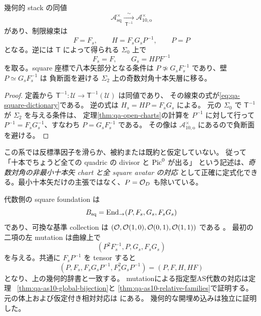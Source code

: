 \begin{corollary}
\label{cor:qa-square-chart}
幾何的 stack の同値
\[
 \mathcal A_{\mathrm{sq}}^{\times}
 \xrightarrow[\ \mathsf T^{-1}\ ]{\ \sim\ }
 \mathcal A_{10,\mathrm o}^{\times}
\]
があり、制限線束は
\begin{equation}
 F=F_s,\qquad H=F_sG_sP^{-1},\qquad P=P
 \label{eq:qa-square-dictionary}
\end{equation}
となる。逆には $\mathsf T$ によって得られる $\Sigma _0$ 上で
\[
 F_s=F,\qquad G_s=HPF^{-1}
\]
を取る。square 座標で八本矢部分となる条件は
$P\not\simeq G_sF_s^{-1}$ であり、壁 $P\simeq G_sF_s^{-1}$ は
負断面を避ける $\Sigma _2$ 上の奇数対角十本矢層に移る。
\end{corollary}

\begin{proof}
定義から $\mathsf T^{-1}:\mathcal U\to\mathsf T^{-1}(\mathcal U)$ は同値であり、
その線束の式が\eqref{eq:qa-square-dictionary}である。
逆の式は $H_s=HP=F_sG_s$ による。
元の $\Sigma _0$ で $\mathsf T^{-1}$ が $\Sigma _2$ を与える条件は、
定理\ref{thm:qa-open-charts}の計算を $P^{-1}$ に対して行って
$P^{-1}=F_sG_s^{-1}$、すなわち $P=G_sF_s^{-1}$ である。
その像は $\mathcal A_{10,\mathrm o}^{\times}$ にあるので負断面を避ける。
\end{proof}

この系では反標準因子を滑らか、被約または既約と仮定していない。
従って「十本でちょうど全ての quadric の divisor と $\operatorname{Pic}^0$ が出る」
という記述は、\emph{奇数対角の非最小十本矢 chart と全 square avatar の対応}
として正確に定式化できる。最小十本矢だけの主張ではなく、$P=\mathcal O_D$ も除いている。

代数側の square foundation は
\[
 B_{\mathrm{sq}}=\operatorname{End}_{\to}(P,F_s,G_s,F_sG_s)
\]
であり、可換な基準 collection は
$(\mathcal O,\mathcal O(1,0),\mathcal O(0,1),\mathcal O(1,1))$ である
\cite[定義1.2・定理1.3]{AvatarVSeven2026}。
最初の二項の左 mutation は曲線上で
\[
 (P^2F_s^{-1},P,G_s,F_sG_s)
\]
を与える。共通に $F_sP^{-1}$ を tensor すると
\[
 (P,F_s,F_sG_sP^{-1},F_s^2G_sP^{-1})=(P,F,H,HF)
\]
となり、上の幾何的辞書と一致する。
mutationによる指定型AS代数の対応は定理~
\ref{thm:qa-as10-global-bijection}と
\ref{thm:qa-as10-relative-families}で証明する。
元の体上および仮定付き相対対応は
\cite[定理51.4・系51.5、定理53.2]{AvatarVSeven2026}にある。
幾何的な開埋め込みは独立に証明した。

